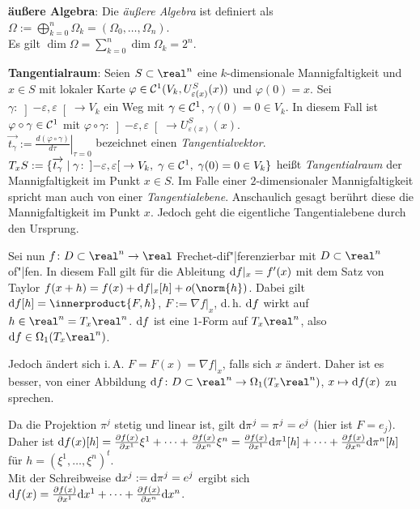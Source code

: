 \textbf{äußere Algebra}:
Die \emph{äußere Algebra} ist definiert als
$\Omega := \bigoplus_{k=0}^n \Omega_k = (\Omega_0, \dotsc, \Omega_n)$. \\
Es gilt $\dim \Omega = \sum_{k=0}^n \dim \Omega_k = 2^n$.

\linie

\textbf{Tangentialraum}:
Seien $S \subset \real^n$ eine $k$-dimensionale Mannigfaltigkeit und $x \in S$
mit lokaler Karte $\varphi \in \mathcal{C}^1(V_k, U_{\varepsilon(x)}^S(x))$
und $\varphi(0) = x$.
Sei $\gamma\colon \left]-\varepsilon, \varepsilon\right[ \rightarrow V_k$
ein Weg mit $\gamma \in \mathcal{C}^1$, $\gamma(0) = 0 \in V_k$.
In diesem Fall ist $\varphi \circ \gamma \in \mathcal{C}^1$ mit
$\varphi \circ \gamma\colon \left]-\varepsilon, \varepsilon\right[
\rightarrow U_{\varepsilon(x)}^S(x)$. \\
$\overrightarrow{t_\gamma} :=
\left.\frac{d(\varphi \circ \gamma)}{d\tau}\right|_{\tau=0}$
bezeichnet einen \emph{Tangentialvektor}. \\
$T_x S := \{\overrightarrow{t_\gamma} \;|\;
\gamma\colon \left]-\varepsilon, \varepsilon\right[ \rightarrow V_k,\;
\gamma \in \mathcal{C}^1,\; \gamma(0) = 0 \in V_k\}$ heißt
\emph{Tangentialraum} der Mannigfaltigkeit im Punkt $x \in S$.
Im Falle einer $2$-dimensionaler Mannigfaltigkeit spricht man auch von einer
\emph{Tangentialebene}.
Anschaulich gesagt berührt diese die Mannigfaltigkeit im Punkt $x$.
Jedoch geht die eigentliche Tangentialebene durch den Ursprung.

\linie
\pagebreak

Sei nun $f\colon D \subset \real^n \rightarrow \real$
Frechet-dif"|ferenzierbar mit $D \subset \real^n$ of"|fen.
In diesem Fall gilt für die Ableitung $\mathrm{d} f|_x = f'(x)$ mit dem Satz von Taylor
$f(x + h) = f(x) + \d f|_x[h] + o(\norm{h})$.
Dabei gilt $\d f[h] = \innerproduct{F, h}$, $F := \nabla f|_x$, d.\,h.
$\mathrm{d} f$ wirkt auf $h \in \real^n = T_x \real^n$.
$\mathrm{d} f$ ist eine $1$-Form auf $T_x \real^n$, also
$\d f \in \Omega_1(T_x \real^n)$.

Jedoch ändert sich i.\,A. $F = F(x) = \nabla f|_x$, falls sich $x$ ändert.
Daher ist es besser, von einer Abbildung
$\d f\colon
D \subset \real^n \rightarrow \Omega_1(T_x \real^n)$, $x \mapsto \mathrm{d} f(x)$
zu sprechen.

Da die Projektion $\pi^j$ stetig und linear ist, gilt $\mathrm{d} \pi^j = \pi^j = e^j$
(hier ist $F = e_j$).
Daher ist $\mathrm{d} f(x)[h] = \frac{\partial f(x)}{\partial x^1} \xi^1 + \dotsb +
\frac{\partial f(x)}{\partial x^n} \xi^n =
\frac{\partial f(x)}{\partial x^1} \mathrm{d} \pi^1[h] + \dotsb +
\frac{\partial f(x)}{\partial x^n} \mathrm{d} \pi^n[h]$ für
$h = (\xi^1, \dotsc, \xi^n)^t$. \\
Mit der Schreibweise $\mathrm{d} x^j := \mathrm{d} \pi^j = e^j$ ergibt sich
$\mathrm{d} f(x) = \frac{\partial f(x)}{\partial x^1} \mathrm{d} x^1 + \dotsb +
\frac{\partial f(x)}{\partial x^n} \mathrm{d} x^n$.


